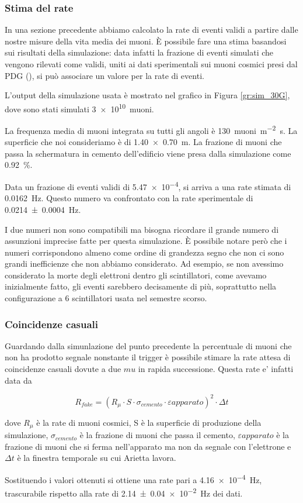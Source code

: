 \subsubsection{Stima del rate}
In una sezione precedente abbiamo calcolato la rate di eventi validi a partire dalle nostre misure della vita media dei muoni. 
\`E possibile fare una stima basandosi sui risultati della simulazione: data infatti la frazione di eventi simulati che vengono rilevati come validi, uniti ai dati sperimentali sui muoni cosmici presi dal PDG (\cite{bib:Patrignani:2016xqp}), si pu\`o associare un valore per la rate di eventi.

L'output della simulazione usata \`e mostrato nel grafico in Figura \ref{gr:sim_30G}, dove sono stati simulati \SI{3e10}{muoni}.

La frequenza media di muoni integrata su tutti gli angoli \`e \SI{130}{muoni\per\square\metre\second}. La superficie che noi consideriamo \`e di \SI{1.40 x 0.70}{\m}. 
La frazione di muoni che passa la schermatura in cemento dell'edificio viene presa dalla simulazione come \SI{0.92}{\percent}.

Data un frazione di eventi validi di \num{5.47e-4}, si arriva a una rate stimata di \SI{0.0162}{\Hz}. 
Questo numero va confrontato con la rate sperimentale di \SI{0.0214 +- 0.0004}{\Hz}.

I due numeri non sono compatibili ma bisogna ricordare il grande numero di assunzioni imprecise fatte per questa simulazione. 
\`E possibile notare per\`o che i numeri corrispondono almeno come ordine di grandezza segno che non ci sono grandi inefficienze che non abbiamo considerato. 
Ad esempio, se non avessimo considerato la morte degli elettroni dentro gli scintillatori, come avevamo inizialmente fatto, gli eventi sarebbero decisamente di pi\`u, soprattutto nella configurazione a 6 scintillatori usata nel semestre scorso.

\subsubsection{Coincidenze casuali}
Guardando dalla simunlazione del punto precedente la percentuale di muoni che non ha prodotto segnale nonstante il trigger \`e possibile stimare la rate attesa di coincidenze casuali dovute a due $mu$ in rapida successione.
Questa rate e' infatti data da

\begin{equation}
	R_{fake} = \left(R_\mu\cdot S\cdot\sigma_{cemento}\cdot\varepsilon{apparato}\right)^2\cdot\Delta t
	\label{eq:fakes}
\end{equation}

dove $R_\mu$ \`e la rate di muoni cosmici, S \`e la superficie di produzione della simulazione, $\sigma_{cemento}$ \`e la frazione di muoni che passa il cemento, $\varepsilon{apparato}$ \`e la frazione di muoni che si ferma nell'apparato ma non da segnale con l'elettrone e $\Delta t$ \`e la finestra temporale su cui Arietta lavora.

Sostituendo i valori ottenuti si ottiene una rate pari a \SI{4.16e-4}{\Hz}, trascurabile rispetto alla rate di \SI{2.14 +- 0.04e-2}{\Hz} dei dati.
